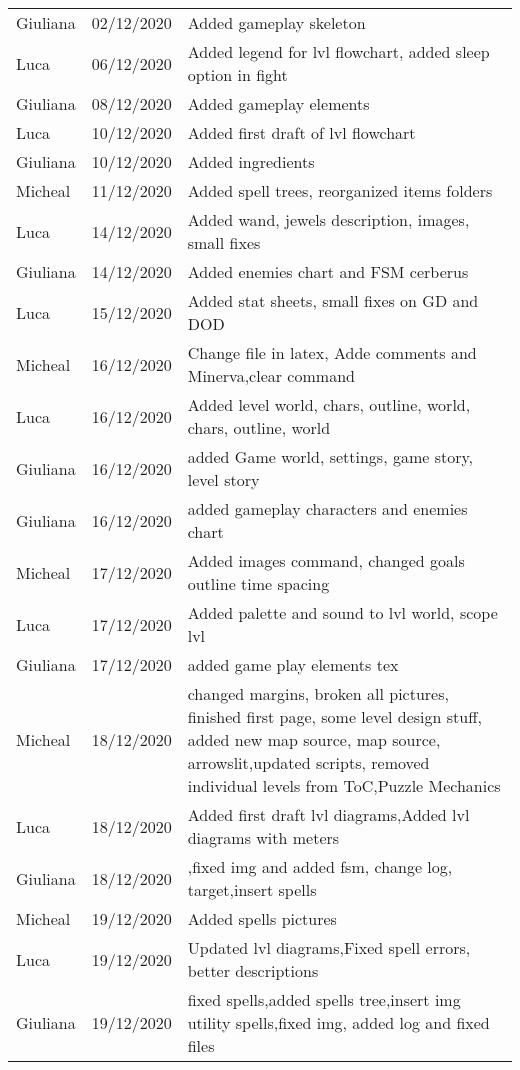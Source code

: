 \begin{tabular}{ m{2cm}m{3cm}m{8cm}}
Giuliana & 02/12/2020 &  Added gameplay skeleton\\
Luca & 06/12/2020 & Added legend for lvl flowchart, added sleep option in fight \\
Giuliana & 08/12/2020 & Added gameplay elements\\
Luca & 10/12/2020 & Added first draft of lvl flowchart\\
Giuliana & 10/12/2020 & Added ingredients\\
Micheal & 11/12/2020 & Added spell trees, reorganized items folders\\
Luca & 14/12/2020 &Added wand, jewels description, images, small fixes \\
Giuliana & 14/12/2020 & Added enemies chart and FSM cerberus\\
Luca & 15/12/2020 &  Added stat sheets, small fixes on GD and DOD\\
Micheal & 16/12/2020 & Change file in latex, Adde comments and Minerva,clear command \\
Luca & 16/12/2020 & Added level world, chars, outline, world, chars, outline, world\\
Giuliana & 16/12/2020 & added Game world, settings, game story, level story\\
Giuliana & 16/12/2020 & added gameplay characters and enemies chart\\
Micheal & 17/12/2020 & Added images command, changed goals outline time spacing\\
Luca & 17/12/2020 & Added palette and sound to lvl world, scope lvl\\
Giuliana & 17/12/2020 & added game play elements tex\\
Micheal & 18/12/2020 & changed margins, broken all pictures, finished first page, some level design stuff, added new map source, map source, arrowslit,updated scripts, removed individual levels from ToC,Puzzle Mechanics\\
Luca & 18/12/2020 & Added first draft lvl diagrams,Added lvl diagrams with meters\\
Giuliana & 18/12/2020 & ,fixed img and added fsm, change log, target,insert spells\\
Micheal & 19/12/2020 & Added spells pictures\\
Luca & 19/12/2020 & Updated lvl diagrams,Fixed spell errors, better descriptions\\
Giuliana & 19/12/2020 & fixed spells,added spells tree,insert img utility spells,fixed img, added log and fixed files\\



\end{tabular}

\pagebreak
